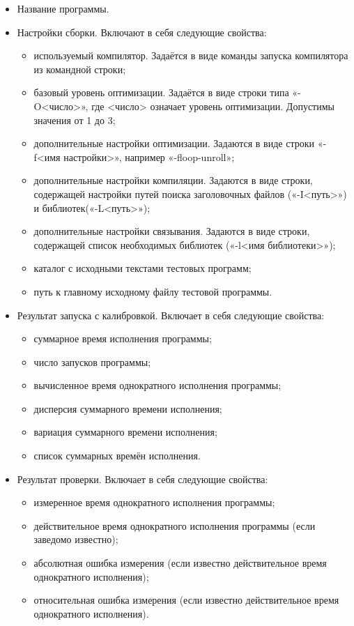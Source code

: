 \begin{itemize}
	\item Название программы.
	\item Настройки сборки. Включают в себя следующие свойства:
	\begin{itemize}
	    \item используемый компилятор. Задаётся в виде команды запуска компилятора из командной строки;
	    \item базовый уровень оптимизации. Задаётся в виде строки типа «-O<число>», где <число> означает уровень оптимизации. Допустимы значения от 1 до 3;
	    \item дополнительные настройки оптимизации. Задаются в виде строки «-f<имя настройки>», например «-floop-unroll»;
	    \item дополнительные настройки компиляции. Задаются в виде строки, содержащей настройки путей поиска заголовочных файлов («-I<путь>») и библиотек(«-L<путь>»);
	    \item дополнительные настройки связывания. Задаются в виде строки, содержащей список необходимых библиотек («-l<имя библиотеки>»);
	    \item каталог с исходными текстами тестовых программ;
	    \item путь к главному исходному файлу тестовой программы.
	\end{itemize}

	\item Результат запуска с калибровкой. Включает в себя следующие свойства:
	\begin{itemize}
		\item суммарное время исполнения программы;
		\item число запусков программы;
		\item вычисленное время однократного исполнения программы;
		\item дисперсия суммарного времени исполнения;
		\item вариация суммарного времени исполнения;
		\item список суммарных времён исполнения.
	\end{itemize}

	\item Результат проверки. Включает в себя следующие свойства:
	\begin{itemize}
		\item измеренное время однократного исполнения программы;
		\item действительное время однократного исполнения программы (если заведомо известно);
		\item абсолютная ошибка измерения (если известно действительное время однократного исполнения);
		\item относительная ошибка измерения (если известно действительное время однократного исполнения).
	\end{itemize}


\end{itemize}
